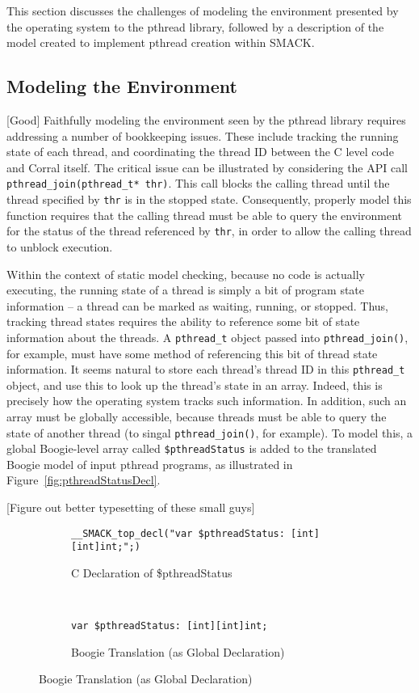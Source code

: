 This section discusses the challenges of modeling the environment
presented by the operating system to the pthread library, followed by
a description of the model created to implement pthread creation
within SMACK.

\subsection{Modeling the Environment}
[Good]
Faithfully modeling the environment seen by the pthread library
requires addressing a number of bookkeeping issues.  These include
tracking the running state of each thread, and coordinating the thread
ID between the C level code and Corral itself.  The critical issue can
be illustrated by considering the API call
\lstinline|pthread_join(pthread_t* thr)|. This call blocks the calling
thread until the thread specified by \lstinline|thr| is in the stopped
state.  Consequently, properly model this function requires that the
calling thread must be able to query the environment for the status of
the thread referenced by \lstinline|thr|, in order to allow the
calling thread to unblock execution. 

Within the context of static model checking, because no code is
actually executing, the running state of a thread is simply a bit of
program state information -- a thread can be marked as waiting,
running, or stopped. Thus, tracking thread states requires the ability
to reference some bit of state information about the threads. A
\lstinline|pthread_t| object passed into \lstinline|pthread_join()|,
for example, must have some method of referencing this bit of thread
state information.  It seems natural to store each thread's thread ID
in this \lstinline|pthread_t| object, and use this to look up the
thread's state in an array.  Indeed, this is precisely how the
operating system tracks such information.  In addition, such an array
must be globally accessible, because threads must be able to query the
state of another thread (to singal \lstinline|pthread_join()|, for
example).  To model this, a global Boogie-level array called
\lstinline|$pthreadStatus| is added to the translated Boogie model of
input pthread programs, as illustrated in
Figure~\ref{fig:pthreadStatusDecl}.

[Figure out better typesetting of these small guys]
\begin{figure}[h]
\centering
\caption{Declaring Global \$pthreadStatus}\label{fig:pthreadStatusDecl}
\begin{subfigure}[b]{1\textwidth}
\centering
\caption{C Declaration of \$pthreadStatus}\label{fig:pthreadStatusDecl_a}
\begin{lstlisting}
__SMACK_top_decl("var $pthreadStatus: [int][int]int;";)
\end{lstlisting}
\end{subfigure}
~
\begin{subfigure}[b]{1\textwidth}
\centering
\caption{Boogie Translation (as Global Declaration)}
\label{fig:pthreadStatusDecl_b}
\begin{lstlisting}[language=boogie]
var $pthreadStatus: [int][int]int;
\end{lstlisting}
\end{subfigure}
\end{figure}

